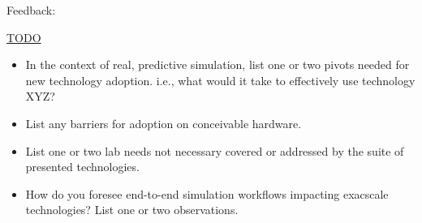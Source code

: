 \documentclass[aspectratio=169]{beamer}
\begin{document}
\begin{frame}{Feedback:}
  \begin{tcolorbox}[colframe=IllinoisOrange]
    \url{TODO}
  \end{tcolorbox}
  \begin{itemize}
    \item In the context of real, predictive simulation, list one or two pivots
      needed for new technology adoption.  i.e., what would it take to
      effectively use technology XYZ?
    \item List any barriers for adoption on conceivable hardware.
    \item List one or two lab needs not necessary covered or addressed by the
      suite of presented technologies.
    \item How do you foresee  end-to-end simulation workflows impacting
      exacscale technologies?  List one or two observations.
  \end{itemize}
\end{frame}
\end{document}
